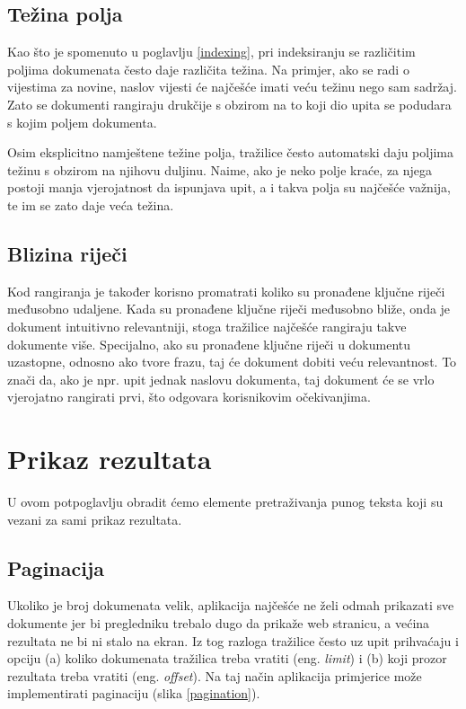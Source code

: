 \documentclass[a4paper,twoside,12pt]{scrreprt}
\begin{document}
\subsection{Težina polja}

Kao što je spomenuto u poglavlju \ref{indexing}, pri indeksiranju se različitim poljima dokumenata često daje različita težina. Na primjer, ako se radi o vijestima za novine, naslov vijesti će najčešće imati veću težinu nego sam sadržaj. Zato se dokumenti rangiraju drukčije s obzirom na to koji dio upita se podudara s kojim poljem dokumenta.

Osim eksplicitno namještene težine polja, tražilice često automatski daju poljima težinu s obzirom na njihovu duljinu. Naime, ako je neko polje kraće, za njega postoji manja vjerojatnost da ispunjava upit, a i takva polja su najčešće važnija, te im se zato daje veća težina.

\subsection{Blizina riječi}

Kod rangiranja je također korisno promatrati koliko su pronađene ključne riječi međusobno udaljene. Kada su pronađene ključne riječi međusobno bliže, onda je dokument intuitivno relevantniji, stoga tražilice najčešće rangiraju takve dokumente više. Specijalno, ako su pronađene ključne riječi u dokumentu uzastopne, odnosno ako tvore frazu, taj će dokument dobiti veću relevantnost. To znači da, ako je npr. upit jednak naslovu dokumenta, taj dokument će se vrlo vjerojatno rangirati prvi, što odgovara korisnikovim očekivanjima.

\section{Prikaz rezultata}

U ovom potpoglavlju obradit ćemo elemente pretraživanja punog teksta koji su vezani za sami prikaz rezultata.

\subsection{Paginacija}

Ukoliko je broj dokumenata velik, aplikacija najčešće ne želi odmah prikazati sve dokumente jer bi pregledniku trebalo dugo da prikaže web stranicu, a većina rezultata ne bi ni stalo na ekran. Iz tog razloga tražilice često uz upit prihvaćaju i opciju (a) koliko dokumenata tražilica treba vratiti (eng. \textit{limit}) i (b) koji prozor rezultata treba vratiti (eng. \textit{offset}). Na taj način aplikacija primjerice može implementirati paginaciju (slika \ref{pagination}).
\end{document}
